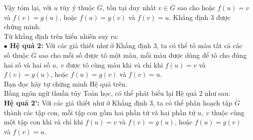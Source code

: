 Vậy tóm lại, với $u$ tùy ý thuộc $\overline{G}$, tồn tại duy nhất $v\in\overline{G}$ sao cho hoặc $f(u)=v$ và $f(v)=g(u)$, hoặc $f(u)=g(v)$ và $f(v)=u$. Khẳng định 3 được chứng minh.\\
Từ khẳng định trên hiển nhiên suy ra:\\
{\bf$\bullet$ Hệ quả 2:} Với các giả thiết như ở Khẳng định 3, ta có thể tô màu tất cả các số thuộc $\overline{G}$ sao cho mỗi số được tô một màu, mỗi màu được dùng để tô cho đúng hai số và hai số $u,\ v$ được tô cùng màu khi và chỉ khi $f(u)=v$ và $f(v)=g(u)$, hoặc $f(u)=g(v)$ và $f(v)=u$.\\
Bạn đọc hãy tự chứng minh Hệ quả trên.\\
Bằng ngôn ngữ thuần túy Toán học, có thể phát biểu lại Hệ quả 2 như sau:\\

{\bf Hệ quả 2':} Với các giả thiết như ở Khẳng định 3, ta có thể phân hoạch tập $\overline{G}$ thành các tập con, mỗi tập con gồm hai phần tử và hai phần tử $u,\ v$ thuộc cùng một tập con khi và chỉ khi $f(u)=v$ và $f(v)=g(u)$, hoặc $f(u)=g(v)$ và $f(v)=u$.

